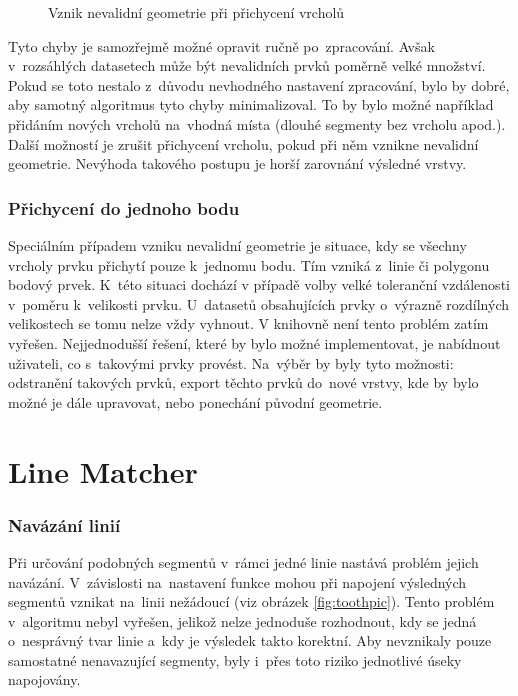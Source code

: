  \begin{figure}[H]
    \centering
      \def\svgwidth{410pt}
      
      \caption{Vznik nevalidní geometrie při přichycení vrcholů}
      \label{fig:vs-nevalidni}
  \end{figure} 

Tyto chyby je samozřejmě možné opravit ručně po~zpracování. Avšak
v~rozsáhlých datasetech může být nevalidních prvků poměrně velké množství.
Pokud se toto nestalo z~důvodu nevhodného nastavení zpracování, bylo by 
dobré, aby samotný algoritmus tyto chyby minimalizoval. To by bylo možné 
například přidáním nových vrcholů na~vhodná místa (dlouhé segmenty bez vrcholu
apod.). Další možností je zrušit přichycení vrcholu, pokud při něm vznikne
nevalidní geometrie. Nevýhoda takového postupu je horší zarovnání výsledné 
vrstvy. 

\subsubsection{Přichycení do jednoho bodu}
Speciálním případem vzniku nevalidní geometrie je situace, kdy se všechny 
vrcholy prvku přichytí pouze k~jednomu bodu. Tím vzniká z~linie či polygonu
bodový prvek. K~této situaci dochází v případě volby velké toleranční 
vzdálenosti v~poměru k~velikosti prvku. U~datasetů obsahujících prvky
o~výrazně rozdílných velikostech se tomu nelze vždy vyhnout. V knihovně
 není tento problém zatím vyřešen. Nejjednodušší řešení, které
by bylo možné implementovat, je nabídnout uživateli, co s~takovými prvky provést.
Na~výběr by byly tyto možnosti: odstranění takových prvků, export těchto prvků 
do~nové vrstvy, kde by bylo možné je dále upravovat, nebo ponechání původní 
geometrie.


\section{Line Matcher}
\label{problemy-lm}

\subsubsection{Navázání linií}
Při určování podobných segmentů v~rámci jedné linie nastává problém jejich
navá\-zání. V~závislosti na~nastavení funkce mohou při napojení výsledných
segmentů vznikat na~linii nežádoucí  (viz obrázek \ref{fig:toothpic}).
Tento problém v~algoritmu nebyl vyřešen, jelikož nelze jednoduše rozhodnout, 
kdy se jedná o~nesprávný tvar linie a~kdy je výsledek takto korektní.
Aby nevznikaly pouze samostatné nenavazující segmenty, byly i~přes toto
riziko jednotlivé úseky napojovány.

